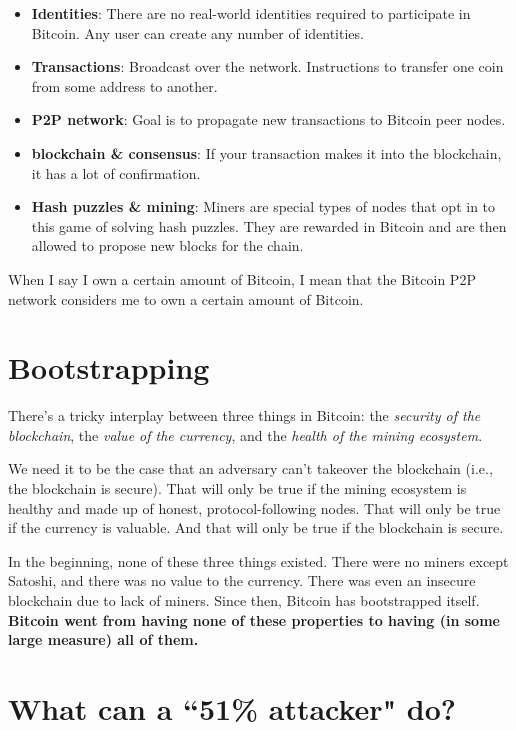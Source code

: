 \documentclass[12pt]{article}
\begin{document}
\begin{itemize}
\item \textbf{Identities}: There are no real-world identities required to participate in Bitcoin. Any user can create any number of identities.
\item \textbf{Transactions}: Broadcast over the network. Instructions to transfer one coin from some address to another.
\item \textbf{P2P network}: Goal is to propagate new transactions to Bitcoin peer nodes.
\item \textbf{blockchain \& consensus}: If your transaction makes it into the blockchain, it has a lot of confirmation.
\item \textbf{Hash puzzles \& mining}: Miners are special types of nodes that opt in to this game of solving hash puzzles. They are rewarded in Bitcoin and are then allowed to propose new blocks for the chain.
\end{itemize}

When I say I own a certain amount of Bitcoin, I mean that the Bitcoin P2P network considers me to own a certain amount of Bitcoin.

\section*{Bootstrapping}

There's a tricky interplay between three things in Bitcoin: the \textit{security of the blockchain}, the \textit{value of the currency}, and the \textit{health of the mining ecosystem}.

We need it to be the case that an adversary can't takeover the blockchain (i.e., the blockchain is secure). That will only be true if the mining ecosystem is healthy and made up of honest, protocol-following nodes. That will only be true if the currency is valuable. And that will only be true if the blockchain is secure.

In the beginning, none of these three things existed. There were no miners except Satoshi, and there was no value to the currency. There was even an insecure blockchain due to lack of miners. Since then, Bitcoin has bootstrapped itself. \textbf{Bitcoin went from having none of these properties to having (in some large measure) all of them.}

\section*{What can a ``51\% attacker" do?}
\end{document}
